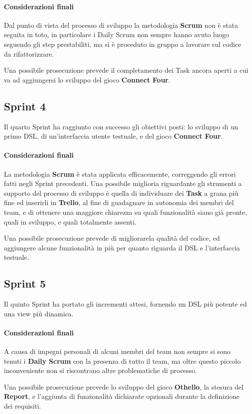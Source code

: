 \paragraph{Considerazioni finali}
Dal punto di vista del processo di sviluppo la metodologia \textbf{Scrum} non è stata seguita in toto, in particolare i Daily Scrum non sempre hanno avuto luogo seguendo gli step prestabiliti, ma si è proceduto in gruppo a lavorare sul codice da rifattorizzare.

Una possibile prosecuzione prevede il completamento dei Task ancora aperti a cui va ad aggiungersi lo sviluppo del gioco \textbf{Connect Four}.

\subsection{Sprint 4}
Il quarto Sprint ha raggiunto con successo gli obiettivi posti: lo sviluppo di un primo DSL, di un'interfaccia utente testuale, e del gioco \textbf{Connect Four}.
\paragraph{Considerazioni finali}
La metodologia \textbf{Scrum} è stata applicata efficacemente, correggendo gli errori fatti negli Sprint precedenti.
%
Una possibile miglioria riguardante gli strumenti a supporto del processo di sviluppo è quella di individuare dei \textbf{Task} a grana più fine ed inserirli in \textbf{Trello}, al fine di guadagnare in autonomia dei membri del team, e di ottenere una maggiore chiarezza su quali funzionalità siano già pronte, quali in sviluppo, e quali totalmente assenti.

Una possibile prosecuzione prevede di migliorarela qualità del codice, ed aggiungere alcune funzionalità in più per quanto riguarda il DSL e l'interfaccia testuale.

\subsection{Sprint 5}
Il quinto Sprint ha portato gli incrementi attesi, fornendo un DSL più potente ed una view più dinamica.
\paragraph{Considerazioni finali}
A causa di impegni personali di alcuni membri del team non sempre si sono tenuti i \textbf{Daily Scrum} con la presenza di tutto il team, ma oltre questo piccolo inconveniente non si riscontrano altre problematiche di processo.

Una possibile prosecuzione prevede lo sviluppo del gioco \textbf{Othello}, la stesura del \textbf{Report}, e l'aggiunta di funzionalità dichiarate opzionali durante la definizione dei requisiti.